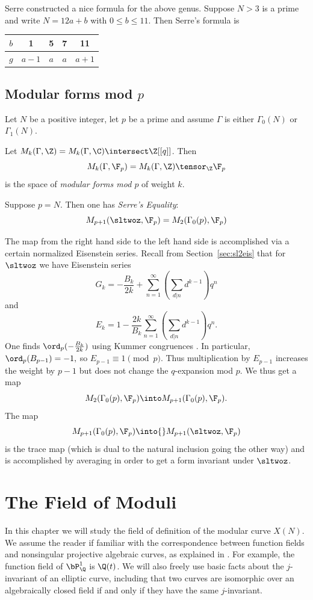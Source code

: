 \documentclass{report}
\begin{document}
Serre constructed a nice formula for the above genus. Suppose $N>3$ is a
prime and write $N=12a+b$ with $0\leq b\leq 11$. Then Serre's formula is
\begin{center}
\begin{tabular}{|c|cccc|}\hline
$b$&1&5&7&11\\\hline
$g$&$a-1$&$a$&$a$&$a+1$\\\hline
\end{tabular}
\end{center}

\section{Modular forms mod $p$}\label{sec:modp}
Let $N$ be a positive integer, let $p$ be a prime and
assume $\Gamma$ is either $\Gamma_0(N)$ or $\Gamma_1(N)$.

\begin{defn}
Let $M_k(\Gamma,\Z)=M_k(\Gamma,\C)\intersect\Z[[q]]$. Then
$$M_k(\Gamma,\F_p)=M_k(\Gamma,\Z)\tensor_{\Z}\F_p$$ is
the space of {\em modular forms mod $p$} of weight $k$.
\end{defn}

Suppose $p=N$.  Then one has {\em Serre's Equality}:
$$M_{p+1}(\sltwoz,\F_p)=M_2(\Gamma_0(p),\F_p)$$


The map from the right hand side to the left hand side is
accomplished via a certain normalized Eisenstein series.
Recall from Section~\ref{sec:sl2eis} that for $\sltwoz$ we have
Eisenstein series
$$G_k=-\frac{B_k}{2k}+\sum_{n=1}^{\infty}\left(\sum_{d|n}d^{k-1}\right)q^n$$
and
$$E_k=1-\frac{2k}{B_k}\sum_{n=1}^{\infty}(\sum_{d|n}d^{k-1})q^n.$$
One finds $\ord_p(-\frac{B_k}{2k})$ using Kummer congruences .
In particular, $\ord_p(B_{p-1})=-1,$
so $E_{p-1}\equiv 1\pmod{p}$. Thus multiplication by $E_{p-1}$
increases the weight by $p-1$ but does not change the $q$-expansion mod $p$.
We thus get a map
$$M_2(\Gamma_0(p),\F_p)\into M_{p+1}(\Gamma_0(p),\F_p).$$
The map
$$M_{p+1}(\Gamma_0(p),\F_p)\into{}M_{p+1}(\sltwoz,\F_p)$$
is the trace map (which is dual to the natural inclusion going
the other way) and is accomplished by averaging in order to get
a form invariant under $\sltwoz$.


\chapter{The Field of Moduli}
In this chapter we will study the field of definition of the modular
curve  $X(N)$.  We assume the reader if familiar
with the correspondence between function fields and nonsingular
projective algebraic curves, as explained in
\cite[\S{}I.6]{hartshorne}.  For example, the function field of
$\bP^1_{\Q}$ is $\Q(t)$.  We will also freely use basic facts about
the $j$-invariant of an elliptic curve, including that two curves are
isomorphic over an algebraically closed field if and only if they have
the same $j$-invariant.
\end{document}
